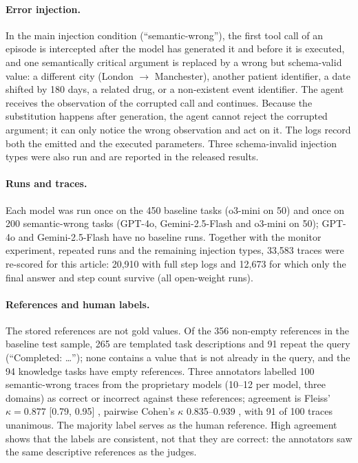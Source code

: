 \documentclass[pdflatex,sn-mathphys-num,Numbered]{sn-jnl}
\begin{document}
\paragraph{Error injection.} In the main injection condition (``semantic-wrong''), the first tool call of an episode is intercepted after the model has generated it and before it is executed, and one semantically critical argument is replaced by a wrong but schema-valid value: a different city (London $\to$ Manchester), another patient identifier, a date shifted by 180 days, a related drug, or a non-existent event identifier. The agent receives the observation of the corrupted call and continues. Because the substitution happens after generation, the agent cannot reject the corrupted argument; it can only notice the wrong observation and act on it. The logs record both the emitted and the executed parameters. Three schema-invalid injection types were also run and are reported in the released results.

\paragraph{Runs and traces.} Each model was run once on the 450 baseline tasks (o3-mini on 50) and once on 200 semantic-wrong tasks (GPT-4o, Gemini-2.5-Flash and o3-mini on 50); GPT-4o and Gemini-2.5-Flash have no baseline runs. Together with the monitor experiment, repeated runs and the remaining injection types, 33,583 traces were re-scored for this article: 20,910 with full step logs and 12,673 for which only the final answer and step count survive (all open-weight runs).

\paragraph{References and human labels.} The stored references are not gold values. Of the 356 non-empty references in the baseline test sample, 265 are templated task descriptions and 91 repeat the query (``Completed: \ldots''); none contains a value that is not already in the query, and the 94 knowledge tasks have empty references. Three annotators labelled 100 semantic-wrong traces from the proprietary models (10--12 per model, three domains) as correct or incorrect against these references; agreement is Fleiss' $\kappa=0.877$ [0.79, 0.95] \cite{fleiss1971kappa}, pairwise Cohen's $\kappa$ 0.835--0.939 \cite{cohen1960kappa}, with 91 of 100 traces unanimous. The majority label serves as the human reference. High agreement shows that the labels are consistent, not that they are correct: the annotators saw the same descriptive references as the judges.
\end{document}
